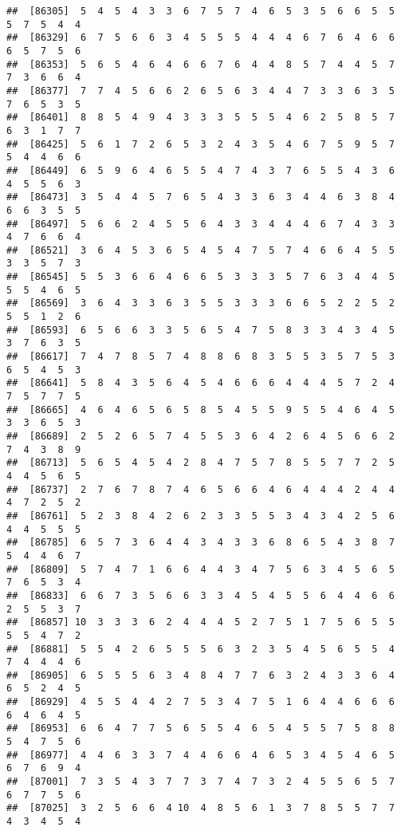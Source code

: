 \documentclass[
]{book}
\begin{document}
\begin{verbatim}
##  [86305]  5  4  5  4  3  3  6  7  5  7  4  6  5  3  5  6  6  5  5  5  7  5  4  4
##  [86329]  6  7  5  6  6  3  4  5  5  5  4  4  4  6  7  6  4  6  6  6  5  7  5  6
##  [86353]  5  6  5  4  6  4  6  6  7  6  4  4  8  5  7  4  4  5  7  7  3  6  6  4
##  [86377]  7  7  4  5  6  6  2  6  5  6  3  4  4  7  3  3  6  3  5  7  6  5  3  5
##  [86401]  8  8  5  4  9  4  3  3  3  5  5  5  4  6  2  5  8  5  7  6  3  1  7  7
##  [86425]  5  6  1  7  2  6  5  3  2  4  3  5  4  6  7  5  9  5  7  5  4  4  6  6
##  [86449]  6  5  9  6  4  6  5  5  4  7  4  3  7  6  5  5  4  3  6  4  5  5  6  3
##  [86473]  3  5  4  4  5  7  6  5  4  3  3  6  3  4  4  6  3  8  4  6  6  3  5  5
##  [86497]  5  6  6  2  4  5  5  6  4  3  3  4  4  4  6  7  4  3  3  4  7  6  6  4
##  [86521]  3  6  4  5  3  6  5  4  5  4  7  5  7  4  6  6  4  5  5  3  3  5  7  3
##  [86545]  5  5  3  6  6  4  6  6  5  3  3  3  5  7  6  3  4  4  5  5  5  4  6  5
##  [86569]  3  6  4  3  3  6  3  5  5  3  3  3  6  6  5  2  2  5  2  5  5  1  2  6
##  [86593]  6  5  6  6  3  3  5  6  5  4  7  5  8  3  3  4  3  4  5  3  7  6  3  5
##  [86617]  7  4  7  8  5  7  4  8  8  6  8  3  5  5  3  5  7  5  3  6  5  4  5  3
##  [86641]  5  8  4  3  5  6  4  5  4  6  6  6  4  4  4  5  7  2  4  7  5  7  7  5
##  [86665]  4  6  4  6  5  6  5  8  5  4  5  5  9  5  5  4  6  4  5  3  3  6  5  3
##  [86689]  2  5  2  6  5  7  4  5  5  3  6  4  2  6  4  5  6  6  2  7  4  3  8  9
##  [86713]  5  6  5  4  5  4  2  8  4  7  5  7  8  5  5  7  7  2  5  4  4  5  6  5
##  [86737]  2  7  6  7  8  7  4  6  5  6  6  4  6  4  4  4  2  4  4  4  7  2  5  2
##  [86761]  5  2  3  8  4  2  6  2  3  3  5  5  3  4  3  4  2  5  6  4  4  5  5  5
##  [86785]  6  5  7  3  6  4  4  3  4  3  3  6  8  6  5  4  3  8  7  5  4  4  6  7
##  [86809]  5  7  4  7  1  6  6  4  4  3  4  7  5  6  3  4  5  6  5  7  6  5  3  4
##  [86833]  6  6  7  3  5  6  6  3  3  4  5  4  5  5  6  4  4  6  6  2  5  5  3  7
##  [86857] 10  3  3  3  6  2  4  4  4  5  2  7  5  1  7  5  6  5  5  5  5  4  7  2
##  [86881]  5  5  4  2  6  5  5  5  6  3  2  3  5  4  5  6  5  5  4  7  4  4  4  6
##  [86905]  6  5  5  5  6  3  4  8  4  7  7  6  3  2  4  3  3  6  4  6  5  2  4  5
##  [86929]  4  5  5  4  4  2  7  5  3  4  7  5  1  6  4  4  6  6  6  6  4  6  4  5
##  [86953]  6  6  4  7  7  5  6  5  5  4  6  5  4  5  5  7  5  8  8  5  4  7  5  6
##  [86977]  4  4  6  3  3  7  4  4  6  6  4  6  5  3  4  5  4  6  5  6  7  6  9  4
##  [87001]  7  3  5  4  3  7  7  3  7  4  7  3  2  4  5  5  6  5  7  6  7  7  5  6
##  [87025]  3  2  5  6  6  4 10  4  8  5  6  1  3  7  8  5  5  7  7  4  3  4  5  4

\end{verbatim}
\end{document}
